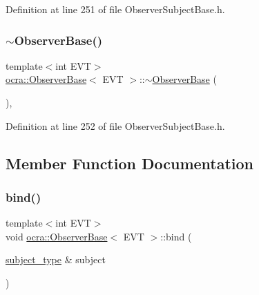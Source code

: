 Definition at line 251 of file Observer\+Subject\+Base.\+h.

\hypertarget{classocra_1_1ObserverBase_ac7da945b97ccdbb8fdcff20ec38541da}{}\label{classocra_1_1ObserverBase_ac7da945b97ccdbb8fdcff20ec38541da} 
\subsubsection{\texorpdfstring{$\sim$\+Observer\+Base()}{~ObserverBase()}}
{\footnotesize\ttfamily template$<$int E\+VT$>$ \\
\hyperlink{classocra_1_1ObserverBase}{ocra\+::\+Observer\+Base}$<$ E\+VT $>$\+::$\sim$\hyperlink{classocra_1_1ObserverBase}{Observer\+Base} (\begin{DoxyParamCaption}{ }\end{DoxyParamCaption})\hspace{0.3cm}{\ttfamily [inline]}, {\ttfamily [protected]}}



Definition at line 252 of file Observer\+Subject\+Base.\+h.



\subsection{Member Function Documentation}
\hypertarget{classocra_1_1ObserverBase_ab251aaa18329dffb4389cbf417564ad6}{}\label{classocra_1_1ObserverBase_ab251aaa18329dffb4389cbf417564ad6} 
\subsubsection{\texorpdfstring{bind()}{bind()}}
{\footnotesize\ttfamily template$<$int E\+VT$>$ \\
void \hyperlink{classocra_1_1ObserverBase}{ocra\+::\+Observer\+Base}$<$ E\+VT $>$\+::bind (\begin{DoxyParamCaption}\item[{\hyperlink{classocra_1_1ObserverBase_a4037f8722d9842eae6f6dd5648b9ce7f}{subject\+\_\+type} \&}]{subject }\end{DoxyParamCaption})\hspace{0.3cm}{\ttfamily [inline]}}



